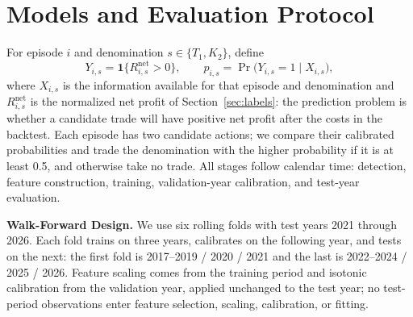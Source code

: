 \documentclass[sigconf,review]{acmart}
\begin{document}
\section{Models and Evaluation Protocol}
\label{sec:method}

For episode $i$ and denomination $s\in\{T_1,K_2\}$, define
\[
Y_{i,s}=\mathbf 1\{R^{\mathrm{net}}_{i,s}>0\},
\qquad
p_{i,s}=
\Pr\big(Y_{i,s}=1\mid X_{i,s}\big),
\]
where $X_{i,s}$ is the information available for that episode and denomination and $R^{\mathrm{net}}_{i,s}$ is the normalized net profit of Section~\ref{sec:labels}: the prediction problem is whether a candidate trade will have positive net profit after the costs in the backtest. Each episode has two candidate actions; we compare their calibrated probabilities and trade the denomination with the higher probability if it is at least 0.5, and otherwise take no trade. All stages follow calendar time: detection, feature construction, training, validation-year calibration, and test-year evaluation.

\smallskip\noindent\textbf{Walk-Forward Design.}
We use six rolling folds with test years 2021 through 2026. Each fold trains on three years, calibrates on the following year, and tests on the next: the first fold is 2017--2019 / 2020 / 2021 and the last is 2022--2024 / 2025 / 2026. Feature scaling comes from the training period and isotonic calibration from the validation year, applied unchanged to the test year; no test-period observations enter feature selection, scaling, calibration, or fitting.
\end{document}
